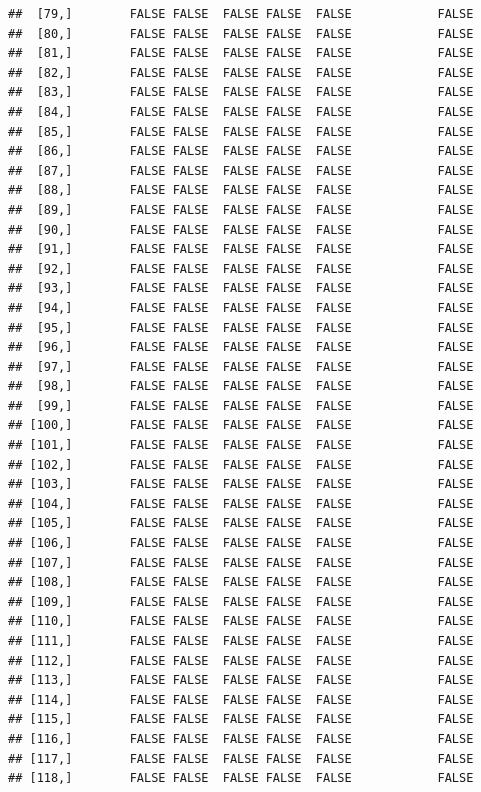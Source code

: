\documentclass[
  english,
  man,floatsintext]{apa6}
\begin{document}
\begin{verbatim}
##  [79,]        FALSE FALSE  FALSE FALSE  FALSE            FALSE
##  [80,]        FALSE FALSE  FALSE FALSE  FALSE            FALSE
##  [81,]        FALSE FALSE  FALSE FALSE  FALSE            FALSE
##  [82,]        FALSE FALSE  FALSE FALSE  FALSE            FALSE
##  [83,]        FALSE FALSE  FALSE FALSE  FALSE            FALSE
##  [84,]        FALSE FALSE  FALSE FALSE  FALSE            FALSE
##  [85,]        FALSE FALSE  FALSE FALSE  FALSE            FALSE
##  [86,]        FALSE FALSE  FALSE FALSE  FALSE            FALSE
##  [87,]        FALSE FALSE  FALSE FALSE  FALSE            FALSE
##  [88,]        FALSE FALSE  FALSE FALSE  FALSE            FALSE
##  [89,]        FALSE FALSE  FALSE FALSE  FALSE            FALSE
##  [90,]        FALSE FALSE  FALSE FALSE  FALSE            FALSE
##  [91,]        FALSE FALSE  FALSE FALSE  FALSE            FALSE
##  [92,]        FALSE FALSE  FALSE FALSE  FALSE            FALSE
##  [93,]        FALSE FALSE  FALSE FALSE  FALSE            FALSE
##  [94,]        FALSE FALSE  FALSE FALSE  FALSE            FALSE
##  [95,]        FALSE FALSE  FALSE FALSE  FALSE            FALSE
##  [96,]        FALSE FALSE  FALSE FALSE  FALSE            FALSE
##  [97,]        FALSE FALSE  FALSE FALSE  FALSE            FALSE
##  [98,]        FALSE FALSE  FALSE FALSE  FALSE            FALSE
##  [99,]        FALSE FALSE  FALSE FALSE  FALSE            FALSE
## [100,]        FALSE FALSE  FALSE FALSE  FALSE            FALSE
## [101,]        FALSE FALSE  FALSE FALSE  FALSE            FALSE
## [102,]        FALSE FALSE  FALSE FALSE  FALSE            FALSE
## [103,]        FALSE FALSE  FALSE FALSE  FALSE            FALSE
## [104,]        FALSE FALSE  FALSE FALSE  FALSE            FALSE
## [105,]        FALSE FALSE  FALSE FALSE  FALSE            FALSE
## [106,]        FALSE FALSE  FALSE FALSE  FALSE            FALSE
## [107,]        FALSE FALSE  FALSE FALSE  FALSE            FALSE
## [108,]        FALSE FALSE  FALSE FALSE  FALSE            FALSE
## [109,]        FALSE FALSE  FALSE FALSE  FALSE            FALSE
## [110,]        FALSE FALSE  FALSE FALSE  FALSE            FALSE
## [111,]        FALSE FALSE  FALSE FALSE  FALSE            FALSE
## [112,]        FALSE FALSE  FALSE FALSE  FALSE            FALSE
## [113,]        FALSE FALSE  FALSE FALSE  FALSE            FALSE
## [114,]        FALSE FALSE  FALSE FALSE  FALSE            FALSE
## [115,]        FALSE FALSE  FALSE FALSE  FALSE            FALSE
## [116,]        FALSE FALSE  FALSE FALSE  FALSE            FALSE
## [117,]        FALSE FALSE  FALSE FALSE  FALSE            FALSE
## [118,]        FALSE FALSE  FALSE FALSE  FALSE            FALSE

\end{verbatim}
\end{document}
